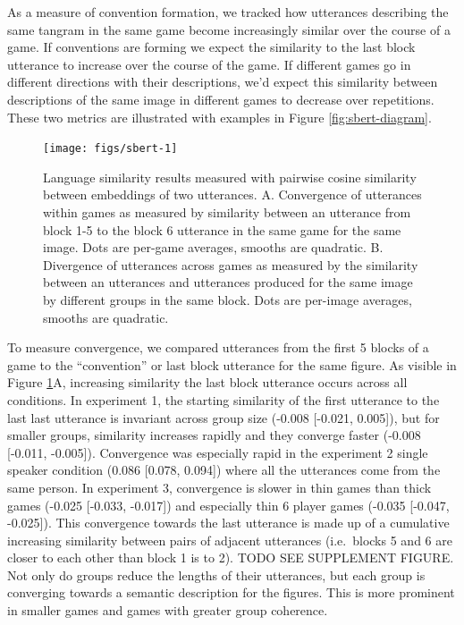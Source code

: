 \documentclass[
  english,
  a4paper,
]{article}
\begin{document}
As a measure of convention formation, we tracked how utterances describing the same tangram in the same game become increasingly similar over the course of a game. If conventions are forming we expect the similarity to the last block utterance to increase over the course of the game. If different games go in different directions with their descriptions, we'd expect this similarity between descriptions of the same image in different games to decrease over repetitions. These two metrics are illustrated with examples in Figure \ref{fig:sbert-diagram}.

\begin{figure}[t!]

{\centering \texttt{[image: figs/sbert-1]} 

}

\caption{Language similarity results measured with pairwise cosine similarity between embeddings of two utterances. A. Convergence of utterances within games as measured by similarity between an utterance from block 1-5 to the block 6 utterance in the same game for the same image. Dots are per-game averages, smooths are quadratic. B. Divergence of utterances across games as measured by the similarity between an utterances and utterances produced for the same image by different groups in the same block. Dots are per-image averages, smooths are quadratic.}\label{fig:sbert}
\end{figure}

To measure convergence, we compared utterances from the first 5 blocks of a game to the ``convention'' or last block utterance for the same figure. As visible in Figure \ref{fig:sbert}A, increasing similarity the last block utterance occurs across all conditions. In experiment 1, the starting similarity of the first utterance to the last last utterance is invariant across group size (-0.008 {[}-0.021, 0.005{]}), but for smaller groups, similarity increases rapidly and they converge faster (-0.008 {[}-0.011, -0.005{]}). Convergence was especially rapid in the experiment 2 single speaker condition (0.086 {[}0.078, 0.094{]}) where all the utterances come from the same person. In experiment 3, convergence is slower in thin games than thick games (-0.025 {[}-0.033, -0.017{]}) and especially thin 6 player games (-0.035 {[}-0.047, -0.025{]}). This convergence towards the last utterance is made up of a cumulative increasing similarity between pairs of adjacent utterances (i.e.~blocks 5 and 6 are closer to each other than block 1 is to 2). TODO SEE SUPPLEMENT FIGURE. Not only do groups reduce the lengths of their utterances, but each group is converging towards a semantic description for the figures. This is more prominent in smaller games and games with greater group coherence.
\end{document}
